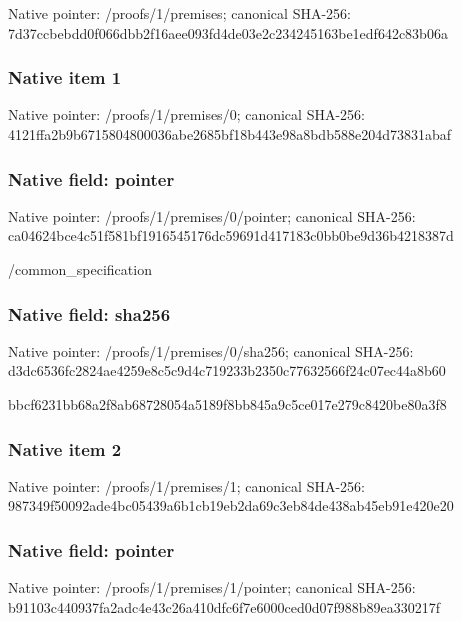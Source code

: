 \documentclass[10pt,a4paper]{article}
\begin{document}
Native pointer: /proofs/1/premises; canonical SHA-256: 7d37ccbebdd0f066dbb2f16a\allowbreak{}ee093fd4de03e2c234245163\allowbreak{}be1edf642c83b06a



\subsubsection{Native item 1}


Native pointer: /proofs/1/premises/0; canonical SHA-256: 4121ffa2b9b6715804800036\allowbreak{}abe2685bf18b443e98a8bdb5\allowbreak{}88e204d73831abaf



\subsubsection{Native field: pointer}


Native pointer: /proofs/1/premises/0/pointer; canonical SHA-256: ca04624bce4c51f581bf1916\allowbreak{}545176dc59691d417183c0bb\allowbreak{}0be9d36b4218387d


/common\_specification


\subsubsection{Native field: sha256}


Native pointer: /proofs/1/premises/0/sha256; canonical SHA-256: d3dc6536fc2824ae4259e8c5\allowbreak{}c9d4c719233b2350c7763256\allowbreak{}6f24c07ec44a8b60


bbcf6231bb68a2f8ab687280\allowbreak{}54a5189f8bb845a9c5ce017e\allowbreak{}279c8420be80a3f8


\subsubsection{Native item 2}


Native pointer: /proofs/1/premises/1; canonical SHA-256: 987349f50092ade4bc05439a\allowbreak{}6b1cb19eb2da69c3eb84de43\allowbreak{}8ab45eb91e420e20



\subsubsection{Native field: pointer}


Native pointer: /proofs/1/premises/1/pointer; canonical SHA-256: b91103c440937fa2adc4e43c\allowbreak{}26a410dfc6f7e6000ced0d07\allowbreak{}f988b89ea330217f
\end{document}

